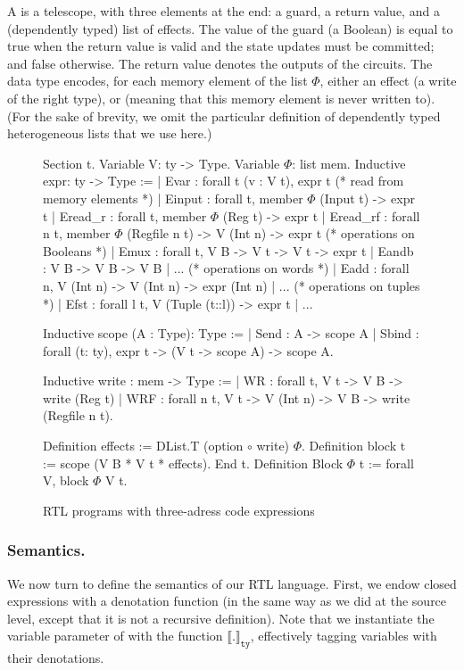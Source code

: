 \documentclass{llncs}
\newcommand{\denote}[1]{\llbracket #1 \rrbracket}
\newcommand{\denotety}[1]{\denote{\mathtt{#1}}_{\mathtt{ty}}}
\begin{document}
A  is a telescope, with three elements at the end: a
guard, a return value, and a (dependently typed) list of effects. 
%
The value of the guard (a Boolean) is equal to true when the return
value is valid and the state updates must be committed; and false
otherwise.
%
The return value denotes the outputs of the circuits. 
%
The data type  encodes, for each memory element of the
list $\Phi$, either an effect (a write of the right type), or 
(meaning that this memory element is never written to). (For the sake
of brevity, we omit the particular definition of dependently typed
heterogeneous lists  that we use here.)


\begin{figure}[t]
  \centering
\begin{coq}
Section t. 
  Variable V: ty -> Type. Variable $\Phi$: list mem. 
  Inductive expr: ty -> Type :=
  | Evar : forall t (v : V t), expr t
  (* read from memory elements *)
  | Einput : forall t, member $\Phi$ (Input t) -> expr t
  | Eread_r : forall t, member $\Phi$ (Reg t) -> expr t
  | Eread_rf : forall n t, member $\Phi$ (Regfile n t) -> V (Int n) -> expr t
  (* operations on Booleans *)
  | Emux : forall t, V B -> V t -> V t -> expr t
  | Eandb : V B -> V B -> V B | ... 
  (* operations on words *)
  | Eadd : forall n, V (Int n) -> V (Int n) -> expr (Int n) | ... 
  (* operations on tuples *)
  | Efst : forall l t, V (Tuple (t::l)) -> expr t | ...
  
  Inductive scope (A : Type): Type :=
  | Send : A -> scope A
  | Sbind : forall (t: ty), expr t -> (V t -> scope A) -> scope A. 
  
  Inductive write : mem -> Type :=
  | WR : forall t, V t -> V B -> write (Reg t)
  | WRF : forall n t, V t -> V (Int n) -> V B ->  write (Regfile n t). 
       
  Definition effects := DList.T (option $\circ$ write) $\Phi$. 
  Definition block t := scope (V B * V t *  effects).         
End t.
Definition Block $\Phi$ t := forall V, block $\Phi$ V t.
\end{coq}
  \caption{RTL programs with three-adress code expressions}
  \label{fig:rtl}
\end{figure}

\subsubsection{Semantics.} We now turn to define the semantics of our RTL
language. 
%
First, we endow closed expressions with a denotation function (in the
same way as we did at the source level, except that it is not a
recursive definition).
%
Note that we instantiate the variable parameter of  with
the function $\denotety{.}$, effectively tagging variables with their
denotations.
\end{document}
